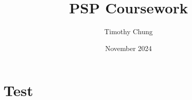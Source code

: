 \documentclass[a4paper, 8pt]{article}
\title{PSP Coursework}
\author{Timothy Chung}
\date{November 2024}
\begin{document}
\section{Test}
\end{document}

